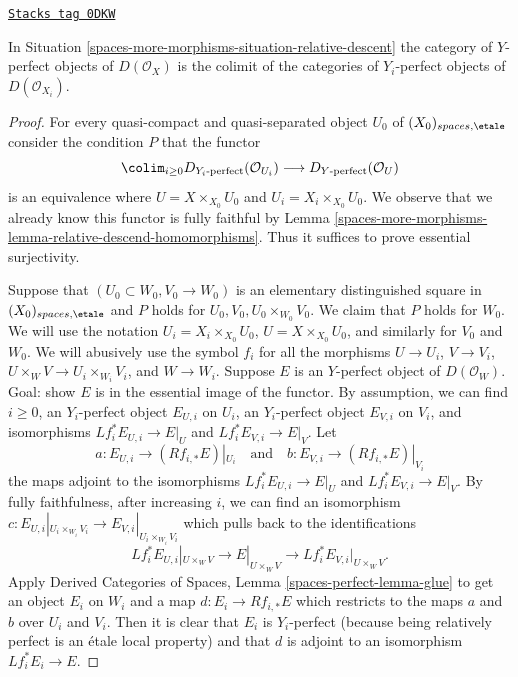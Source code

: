 \begin{lemma}
\label{spaces-more-morphisms-lemma-descend-relatively-perfect}
\href{https://stacks.math.columbia.edu/tag/0DKW}{\texttt{Stacks tag 0DKW}}

In Situation \ref{spaces-more-morphisms-situation-relative-descent} the category of
$Y$-perfect objects of $D(\mathcal{O}_X)$ is the colimit of the categories
of $Y_i$-perfect objects of $D(\mathcal{O}_{X_i})$.
\end{lemma}

\begin{proof}
For every quasi-compact and quasi-separated object $U_0$ of
$(X_0)_{spaces, \etale}$ consider the condition $P$
that the functor
$$
\colim_{i \geq 0} D_{Y_i\text{-perfect}}(\mathcal{O}_{U_i})
\longrightarrow
D_{Y\text{-perfect}}(\mathcal{O}_U)
$$
is an equivalence where $U = X \times_{X_0} U_0$ and
$U_i = X_i \times_{X_0} U_0$.
We observe that we already know this functor is fully faithful
by Lemma \ref{spaces-more-morphisms-lemma-relative-descend-homomorphisms}. Thus it suffices to prove
essential surjectivity.

\medskip\noindent
Suppose that $(U_0 \subset W_0, V_0 \to W_0)$ is an elementary
distinguished square in $(X_0)_{spaces, \etale}$
and $P$ holds for $U_0, V_0, U_0 \times_{W_0} V_0$.
We claim that $P$ holds for $W_0$. We will use the notation
$U_i = X_i \times_{X_0} U_0$, $U = X \times_{X_0} U_0$,
and similarly for $V_0$ and $W_0$. We will abusively use the symbol
$f_i$ for all the morphisms $U \to U_i$, $V \to V_i$,
$U \times_W V \to U_i \times_{W_i} V_i$, and $W \to W_i$.
Suppose $E$ is an $Y$-perfect object of $D(\mathcal{O}_W)$.
Goal: show $E$ is in the essential image of the functor.
By assumption,
we can find $i \geq 0$, an $Y_i$-perfect object $E_{U, i}$ on $U_i$,
an $Y_i$-perfect object $E_{V, i}$ on $V_i$, and
isomorphisms $Lf_i^*E_{U, i} \to E|_U$ and $Lf_i^*E_{V, i} \to E|_V$.
Let
$$
a : E_{U, i} \to (Rf_{i, *}E)|_{U_i}
\quad\text{and}\quad
b : E_{V, i} \to (Rf_{i, *}E)|_{V_i}
$$
the maps adjoint to the isomorphisms $Lf_i^*E_{U, i} \to E|_U$
and $Lf_i^*E_{V, i} \to E|_V$.
By fully faithfulness, after increasing $i$,
we can find an isomorphism
$c : E_{U, i}|_{U_i \times_{W_i} V_i} \to E_{V, i}|_{U_i \times_{W_i} V_i}$
which pulls back to the identifications
$$
Lf_i^*E_{U, i}|_{U \times_W V} \to E|_{U \times_W V} \to
Lf_i^*E_{V, i}|_{U \times_W V}.
$$
Apply Derived Categories of Spaces, Lemma
\ref{spaces-perfect-lemma-glue}
to get an object $E_i$ on $W_i$ and a map $d : E_i \to Rf_{i, *}E$
which restricts to the maps $a$ and $b$ over $U_i$ and $V_i$.
Then it is clear that $E_i$ is $Y_i$-perfect (because being
relatively perfect is an \'etale local property) and that
$d$ is adjoint to an isomorphism $Lf_i^*E_i \to E$.


\end{proof}

